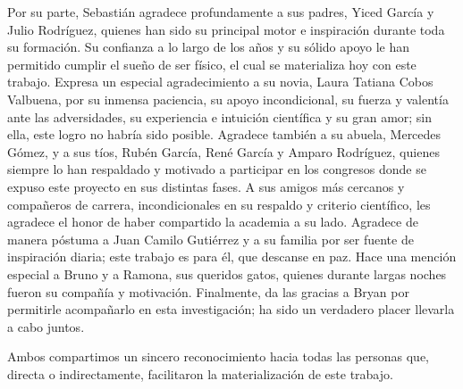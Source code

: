 Por su parte, Sebastián agradece profundamente a sus padres, Yiced García y Julio Rodríguez, quienes han sido su principal motor e inspiración durante toda su formación. Su confianza a lo largo de los años y su sólido apoyo le han permitido cumplir el sueño de ser físico, el cual se materializa hoy con este trabajo. Expresa un especial agradecimiento a su novia, Laura Tatiana Cobos Valbuena, por su inmensa paciencia, su apoyo incondicional, su fuerza y valentía ante las adversidades, su experiencia e intuición científica y su gran amor; sin ella, este logro no habría sido posible. Agradece también a su abuela, Mercedes Gómez, y a sus tíos, Rubén García, René García y Amparo Rodríguez, quienes siempre lo han respaldado y motivado a participar en los congresos donde se expuso este proyecto en sus distintas fases. A sus amigos más cercanos y compañeros de carrera, incondicionales en su respaldo y criterio científico, les agradece el honor de haber compartido la academia a su lado. Agradece de manera póstuma a Juan Camilo Gutiérrez y a su familia por ser fuente de inspiración diaria; este trabajo es para él, que descanse en paz. Hace una mención especial a Bruno y a Ramona, sus queridos gatos, quienes durante largas noches fueron su compañía y motivación. Finalmente, da las gracias a Bryan por permitirle acompañarlo en esta investigación; ha sido un verdadero placer llevarla a cabo juntos.

Ambos compartimos un sincero reconocimiento hacia todas las personas que, directa o indirectamente, facilitaron la materialización de este trabajo.